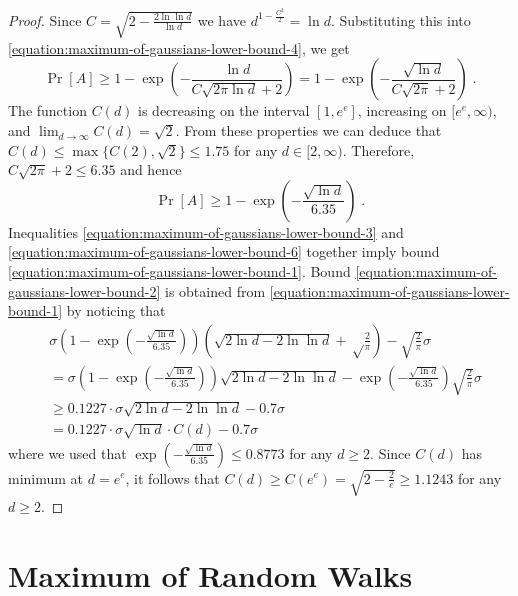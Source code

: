 \documentclass{article}
\begin{document}
\begin{proof}
Since $C = \sqrt{2 - \frac{2 \ln \ln d}{\ln d}}$ we have $d^{1-\frac{C^2}{2}} = \ln d$. Substituting this into \eqref{equation:maximum-of-gaussians-lower-bound-4}, we get
\begin{equation}
\label{equation-maximum-of-gaussians-lower-bound-5}
\Pr[A] \ge 1 - \exp\left(-\frac{\ln d}{C \sqrt{2\pi \ln d}+2}\right) = 1 - \exp\left(-\frac{\sqrt{\ln d}}{C \sqrt{2\pi}+2}\right) \; .
\end{equation}
The function $C(d)$ is decreasing on the interval $[1,e^e]$, increasing on $[e^e, \infty)$, and $\lim_{d \to \infty} C(d) = \sqrt{2}$. From these properties
we can deduce that $C(d) \le \max\{C(2), \sqrt{2}\} \le 1.75$ for any $d \in [2,\infty)$. Therefore, $C\sqrt{2 \pi} + 2 \le 6.35$ and hence
\begin{equation}
\label{equation:maximum-of-gaussians-lower-bound-6}
\Pr[A] \ge 1 - \exp\left(-\frac{\sqrt{\ln d}}{6.35}\right) \; .
\end{equation}
Inequalities \eqref{equation:maximum-of-gaussians-lower-bound-3} and \eqref{equation:maximum-of-gaussians-lower-bound-6} together imply bound \eqref{equation:maximum-of-gaussians-lower-bound-1}.
Bound \eqref{equation:maximum-of-gaussians-lower-bound-2} is obtained from \eqref{equation:maximum-of-gaussians-lower-bound-1} by noticing that
\begin{align*}
& \sigma \left(1 - \exp\left(-\frac{\sqrt{\ln d}}{6.35}\right)\right) \left(\sqrt{2 \ln d - 2 \ln \ln d} +\sqrt\frac{2}{\pi}\right) -\sqrt{\frac{2}{\pi}} \sigma \\
& = \sigma \left(1 - \exp\left(-\frac{\sqrt{\ln d}}{6.35}\right)\right) \sqrt{2 \ln d - 2 \ln \ln d} - \exp\left(-\frac{\sqrt{\ln d}}{6.35}\right) \sqrt{\frac{2}{\pi}} \sigma \\
& \ge 0.1227 \cdot \sigma \sqrt{2 \ln d - 2 \ln \ln d} - 0.7 \sigma \\
& = 0.1227 \cdot \sigma \sqrt{\ln d} \cdot C(d) - 0.7 \sigma
\end{align*}
where we used that $\exp\left(-\frac{\sqrt{\ln d}}{6.35}\right) \le 0.8773$ for any $d \ge 2$.
Since $C(d)$ has minimum at $d = e^e$, it follows that $C(d) \ge C(e^e) = \sqrt{2 - \frac{2}{e}} \ge 1.1243$ for any $d \ge 2$.
\end{proof}

\section{Maximum of Random Walks}
\label{section:maximum-of-random-walks}
\end{document}
